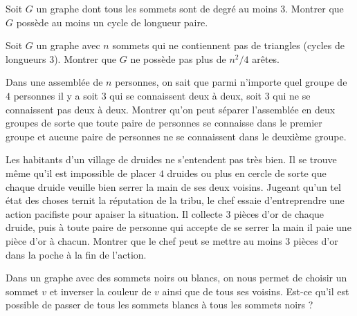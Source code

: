 \begin{exo}
Soit $G$ un graphe dont tous les sommets sont de degré au moins $3$. Montrer que $G$ possède au moins un cycle de longueur paire.
\end{exo}


\begin{exo}
Soit $G$ un graphe avec $n$ sommets qui ne contiennent pas de triangles (cycles de longueurs $3$). Montrer que $G$ ne possède pas plus de $n^2/4$ arêtes.
\end{exo}


\begin{exo}[OMM 2009]
Dans une assemblée de $n$ personnes, on sait que parmi n’importe quel groupe de $4$ personnes il y a soit $3$ qui se connaissent deux à deux, soit $3$ qui ne se connaissent pas deux à deux. Montrer qu’on peut séparer l’assemblée en deux groupes de sorte que toute paire de personnes se connaisse dans le premier groupe et aucune paire de personnes ne se connaissent dans le deuxième groupe.
\end{exo}


\begin{exo}
Les habitants d’un village de druides ne s'entendent pas très bien. Il se trouve même qu'il est impossible de placer $4$ druides ou plus en cercle de sorte que chaque druide veuille bien serrer la main de ses deux voisins. Jugeant qu’un tel état des choses ternit la réputation de la tribu, le chef essaie d’entreprendre une action pacifiste pour apaiser la situation. Il collecte 3 pièces d’or de chaque druide, puis à toute paire de personne qui accepte de se serrer la main il paie une pièce d’or à chacun. Montrer que le chef peut se mettre au moins $3$ pièces d’or dans la poche à la fin de l’action.
\end{exo}


\begin{exo}%
Dans un graphe avec des sommets noirs ou blancs, on nous permet de choisir un sommet $v$ et inverser la couleur de $v$ ainsi que de tous ses voisins. Est-ce qu’il est possible de passer de tous les sommets blancs à tous les sommets noirs ?
\end{exo}



